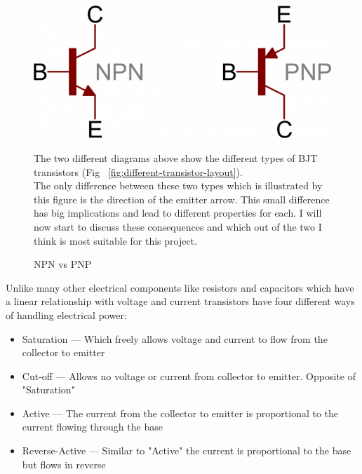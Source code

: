 \documentclass{article}
\begin{document}
\begin{figure}
    \includegraphics{pictures/npn-pnp-symbols.png}
    \caption{NPN vs PNP} \label{fig:different-transitor-layout}
    \vspace{0.5cm}

    The two different diagrams above show the different types of BJT transistors
    (Fig ~\ref{fig:different-transistor-layout}). \\

    The only difference between these two types which is illustrated by this figure is the direction of the
    emitter arrow. This small difference has big implications and lead to different properties for each. I
    will now start to discuss these consequences and which out of the two I think is most suitable for this
    project.

\end{figure}

\break

Unlike many other electrical components like resistors and capacitors which have a linear relationship with
voltage and current transistors have four different ways of handling electrical power:

\begin{itemize}
    \item Saturation     --- Which freely allows voltage and current to flow from the collector to emitter
    \item Cut-off        --- Allows no voltage or current from collector to emitter. Opposite of "Saturation"
    \item Active         --- The current from the collector to emitter is proportional to the current flowing
        through the base
    \item Reverse-Active --- Similar to "Active" the current is proportional to the base but flows in reverse
\end{itemize}
\end{document}
